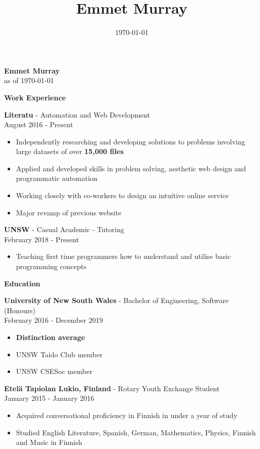 \documentclass[a4paper]{article}
\title{\textbf{Emmet Murray}}
\date{\today}
\newcommand{\minititle}[1]{{\Large \begin{center} \textbf{#1} \end{center}} \vspace{0.2cm}}
\newcommand{\resumeEntry}[3]{{\large \textbf{#1} - #2} \\ \small{#3} }
\begin{document}
 

\begin{center}
    { \Huge \textbf{Emmet Murray}} \\
    \vspace{0.4cm}
    as of \today
\end{center}
%
\begin{minipage}[t]{0.6\linewidth}   
    {
        \minititle{Work Experience}
        \resumeEntry{Literatu}{Automation and Web Development}{August 2016 - Present}
        \begin{itemize}
            \setlength\itemsep{0.03cm}
            \item Independently researching and developing solutions to problems involving large datasets of over \textbf{15,000 files}
            \item Applied and developed skills in problem solving, aesthetic web design and programmatic automation
            \item Working closely with co-workers to design an intuitive online service
            \item Major revamp of previous website
        \end{itemize}
        \vspace{0.3cm}
        \resumeEntry{UNSW}{Casual Academic - Tutoring}{February 2018 - Present}
        \begin{itemize}
            \setlength\itemsep{0.03cm}
            \item Teaching first time programmers how to understand and utilise basic programming concepts
        \end{itemize}
    }
    {
        \vspace{0.1cm}
        \minititle{Education}
        \resumeEntry{University of New South Wales}{Bachelor of Engineering, Software (Honours)}{February 2016 - December 2019}
        \begin{itemize}
            \setlength\itemsep{0.03cm}
            \item \textbf{Distinction average}
            \item UNSW Taido Club member
            \item UNSW CSESoc member
        \end{itemize}
        \vspace{0.4cm}
        \resumeEntry{Etel{\"a} Tapiolan Lukio, Finland}{Rotary Youth Exchange Student}{January 2015 - January 2016}
        \begin{itemize}
            \setlength\itemsep{0.03cm}
            \item Acquired conversational proficiency in Finnish in under a year of study
            \item Studied English Literature, Spanish, German, Mathematics, Physics, Finnish and Music in Finnish


\end{itemize}}
\end{minipage}
\end{document}
